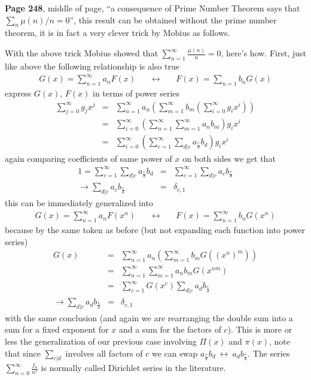 \documentclass[aps,preprint,preprintnumbers,nofootinbib,showpacs,prd]{revtex4-1}
\newcommand{\nbea}{\begin{eqnarray*}}
\newcommand{\neea}{\end{eqnarray*}}
\begin{document}
{\bf Page 248}, middle of page, ``a consequence of Prime Number Theorem says that $\sum_n \mu(n)/n=0$'', this result can be obtained without the prime number theorem, it is in fact a very clever trick by Mobius as follows.

With the above trick Mobius showed that $\sum_{n=1}^\infty \frac{\mu(n)}{n} = 0$, here's how. First, just like above the following relationship is also true
%
\nbea
G(x) = \sum_{n=1}^\infty a_n F(x) &~~~~~\longleftrightarrow~~~~~& F(x) = \sum_{n=1} b_n G(x)
\neea
%
express $G(x)$, $F(x)$ in terms of power series
%
\nbea
\sum_{j=0}^\infty g_j x^j & = & \sum_{n=1}^\infty a_n \left(\sum_{m=1}^\infty b_m \left(\sum_{i=0}^\infty g_i x^i\right)\right) \\
& = &\sum_{i=0}^\infty \left( \sum_{n=1}^\infty\sum_{m=1}^\infty a_n  b_m \right) g_i x^i \\
& = &\sum_{i=0}^\infty \left( \sum_{c=1}^\infty\sum_{d|c} a_{\frac{c}{d}}  b_{d} \right) g_i x^i
\neea
%
again comparing coefficients of same power of $x$ on both sides we get that
%
\nbea
1 = \sum_{c=1}^\infty\sum_{d|c} a_{\frac{c}{d}}  b_{d} & = & \sum_{c=1}^\infty\sum_{d|c} a_c  b_{\frac{c}{d}} \\
\to \sum_{d|c} a_c  b_{\frac{c}{d}} & = & \delta_{c,1}
\neea
%
this can be immediately generalized into
%
\nbea
G(x) = \sum_{n=1}^\infty a_n F(x^n) &~~~~~\longleftrightarrow~~~~~& F(x) = \sum_{n=1}^\infty b_n G(x^n)
\neea
%
because by the same token as before (but not expanding each function into power series)
%
\nbea
G(x) & = & \sum_{n=1}^\infty a_n \left(\sum_{m=1}^\infty b_m G\left (\left(x^n\right)^m\right)\right) \\
& = & \sum_{n=1}^\infty \sum_{m=1}^\infty a_n b_m G(x^{nm}) \\
& = & \sum_{c=1}^\infty G(x^c) \sum_{d|c} a_{d} b_{\frac{c}{d}} \\
\to \sum_{d|c} a_{d} b_{\frac{c}{d}} & = & \delta_{c,1}
\neea
%
with the same conclusion (and again we are rearranging the double sum into a sum for a fixed exponent for $x$ and a sum for the factors of $c$). This is more or less the generalization of our previous case involving $\Pi(x)$ and $\pi(x)$, note that since $\sum_{c|d}$ involves all factors of $c$ we can swap $a_{\frac{c}{d}}  b_{d} ~\leftrightarrow~ a_d  b_{\frac{c}{d}}$. The series $\sum_{n=0}^\infty \frac{f_n}{n^s}$ is normally called Dirichlet series in the literature.
\end{document}
